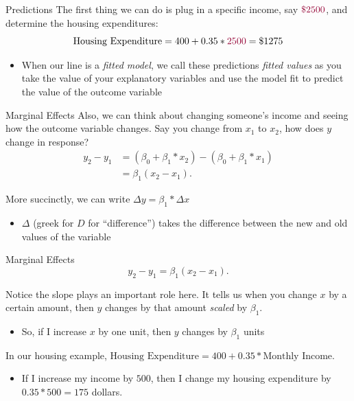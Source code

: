 \documentclass[aspectratio=169,t,11pt,table]{beamer}
\begin{document}
\begin{frame}{Predictions}
  The first thing we can do is plug in a specific income, say $\raspberry{\$2500}$, and determine the housing expenditures:
  $$
    \text{Housing Expenditure} = 400 + 0.35 * \raspberry{2500} = \$1275
  $$

  \begin{itemize}
    \item When our line is a \emph{fitted model}, we call these predictions \emph{fitted values} as you take the value of your explanatory variables and use the model fit to predict the value of the outcome variable
  \end{itemize}
\end{frame}

\begin{frame}{Marginal Effects}
  Also, we can think about changing someone's income and seeing how the outcome variable changes. Say you change from $x_1$ to $x_2$, how does $y$ change in response?
  \begin{align*}
    y_2 - y_1 
    &= (\beta_0 + \beta_1 * x_2) - (\beta_0 + \beta_1 * x_1) \\
    &= \beta_1 (x_2 - x_1).
  \end{align*}

  \pause
  \bigskip
  More succinctly, we can write $\Delta y = \beta_1 * \Delta x$
  \begin{itemize}
    \item $\Delta$ (greek for $D$ for ``difference'') takes the difference between the new and old values of the variable
  \end{itemize}
\end{frame}

\begin{frame}{Marginal Effects}
  \vspace*{-2\bigskipamount}
  $$
    y_2 - y_1  = \beta_1 (x_2 - x_1).
  $$

  Notice the slope plays an important role here. It tells us when you change $x$ by a certain amount, then $y$ changes by that amount \emph{scaled} by $\beta_1$. 
  \begin{itemize}
    \item So, if I increase $x$ by one unit, then $y$ changes by $\beta_1$ units
  \end{itemize}

  \pause
  \bigskip
  In our housing example, $\text{Housing Expenditure} = 400 + 0.35 * \text{Monthly Income}$. 
  \begin{itemize}
    \item If I increase my income by $500$, then I change my housing expenditure by $0.35 * 500 = 175$ dollars.
  \end{itemize}
\end{frame}
\end{document}
